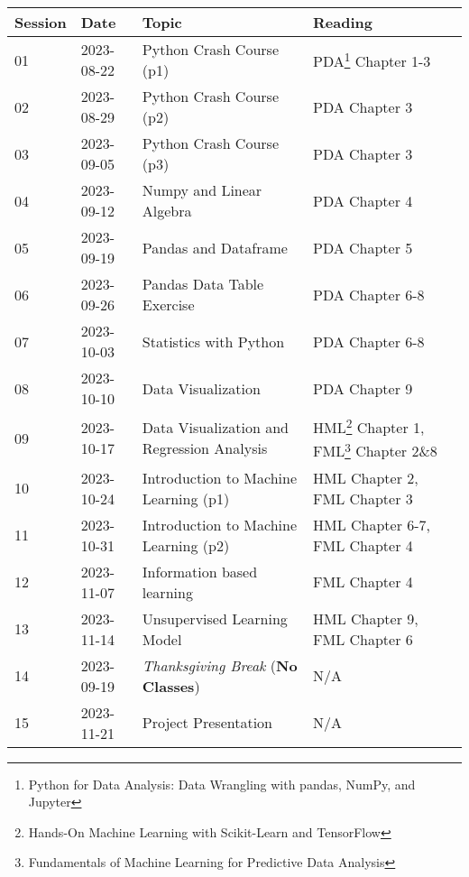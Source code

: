 \documentclass{article}
\begin{document}
\begin{center}
\begin{tabular}{lllll}
\hline
Session & Date  & Topic                                 & Reading \\
\hline
01       & 2023-08-22 & Python Crash Course (p1)              & PDA\footnote{Python for Data Analysis: Data Wrangling with pandas, NumPy, and Jupyter} Chapter 1-3\\
02       & 2023-08-29 & Python Crash Course (p2)              & PDA Chapter 3\\
03       & 2023-09-05 & Python Crash Course (p3)              & PDA Chapter 3\\
04       & 2023-09-12 & Numpy and Linear Algebra              & PDA Chapter 4\\
05       & 2023-09-19 & Pandas and Dataframe                  & PDA Chapter 5\\
06       & 2023-09-26 & Pandas Data Table Exercise            & PDA Chapter 6-8\\
07       & 2023-10-03 & Statistics with Python                & PDA Chapter 6-8\\
08       & 2023-10-10 & Data Visualization                    & PDA Chapter 9\\
09       & 2023-10-17 & Data Visualization and Regression Analysis & HML\footnote{Hands-On Machine Learning with Scikit-Learn and TensorFlow} Chapter 1, FML\footnote{Fundamentals of Machine Learning for Predictive Data Analysis} Chapter 2\&8\\
10       & 2023-10-24 & Introduction to Machine Learning (p1) & HML Chapter 2, FML Chapter 3\\
11       & 2023-10-31 & Introduction to Machine Learning (p2) & HML Chapter 6-7, FML Chapter 4\\
12       & 2023-11-07 & Information based learning            & FML Chapter 4\\
13       & 2023-11-14 & Unsupervised Learning Model           & HML Chapter 9, FML Chapter 6\\
14       & 2023-09-19 & \textit{Thanksgiving Break} (\textbf{No Classes})                & N/A\\
15       & 2023-11-21 & Project Presentation                  &N/A\\
\hline        
\end{tabular}
\end{center}
\end{document}
